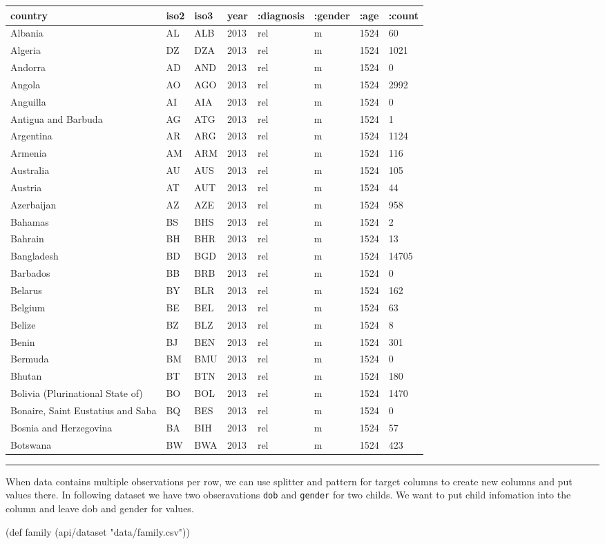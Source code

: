 \documentclass[]{article}
\newenvironment{Shaded}{\begin{snugshade}}{\end{snugshade}}
\newcommand{\BuiltInTok}[1]{#1}
\newcommand{\FunctionTok}[1]{\textcolor[rgb]{0.00,0.00,0.00}{#1}}
\newcommand{\NormalTok}[1]{#1}
\newcommand{\StringTok}[1]{\textcolor[rgb]{0.31,0.60,0.02}{#1}}
\begin{document}
\begin{longtable}[]{@{}llllllll@{}}
\toprule
country & iso2 & iso3 & year & :diagnosis & :gender & :age &
:count\tabularnewline
\midrule
\endhead
Albania & AL & ALB & 2013 & rel & m & 1524 & 60\tabularnewline
Algeria & DZ & DZA & 2013 & rel & m & 1524 & 1021\tabularnewline
Andorra & AD & AND & 2013 & rel & m & 1524 & 0\tabularnewline
Angola & AO & AGO & 2013 & rel & m & 1524 & 2992\tabularnewline
Anguilla & AI & AIA & 2013 & rel & m & 1524 & 0\tabularnewline
Antigua and Barbuda & AG & ATG & 2013 & rel & m & 1524 &
1\tabularnewline
Argentina & AR & ARG & 2013 & rel & m & 1524 & 1124\tabularnewline
Armenia & AM & ARM & 2013 & rel & m & 1524 & 116\tabularnewline
Australia & AU & AUS & 2013 & rel & m & 1524 & 105\tabularnewline
Austria & AT & AUT & 2013 & rel & m & 1524 & 44\tabularnewline
Azerbaijan & AZ & AZE & 2013 & rel & m & 1524 & 958\tabularnewline
Bahamas & BS & BHS & 2013 & rel & m & 1524 & 2\tabularnewline
Bahrain & BH & BHR & 2013 & rel & m & 1524 & 13\tabularnewline
Bangladesh & BD & BGD & 2013 & rel & m & 1524 & 14705\tabularnewline
Barbados & BB & BRB & 2013 & rel & m & 1524 & 0\tabularnewline
Belarus & BY & BLR & 2013 & rel & m & 1524 & 162\tabularnewline
Belgium & BE & BEL & 2013 & rel & m & 1524 & 63\tabularnewline
Belize & BZ & BLZ & 2013 & rel & m & 1524 & 8\tabularnewline
Benin & BJ & BEN & 2013 & rel & m & 1524 & 301\tabularnewline
Bermuda & BM & BMU & 2013 & rel & m & 1524 & 0\tabularnewline
Bhutan & BT & BTN & 2013 & rel & m & 1524 & 180\tabularnewline
Bolivia (Plurinational State of) & BO & BOL & 2013 & rel & m & 1524 &
1470\tabularnewline
Bonaire, Saint Eustatius and Saba & BQ & BES & 2013 & rel & m & 1524 &
0\tabularnewline
Bosnia and Herzegovina & BA & BIH & 2013 & rel & m & 1524 &
57\tabularnewline
Botswana & BW & BWA & 2013 & rel & m & 1524 & 423\tabularnewline
\bottomrule
\end{longtable}

\begin{center}\rule{0.5\linewidth}{0.5pt}\end{center}

When data contains multiple observations per row, we can use splitter
and pattern for target columns to create new columns and put values
there. In following dataset we have two obseravations \texttt{dob} and
\texttt{gender} for two childs. We want to put child infomation into the
column and leave dob and gender for values.

\begin{Shaded}
\begin{Highlighting}[]
\NormalTok{(}\BuiltInTok{def}\FunctionTok{ family }\NormalTok{(api/dataset }\StringTok{"data/family.csv"}\NormalTok{))}
\end{Highlighting}
\end{Shaded}
\end{document}
